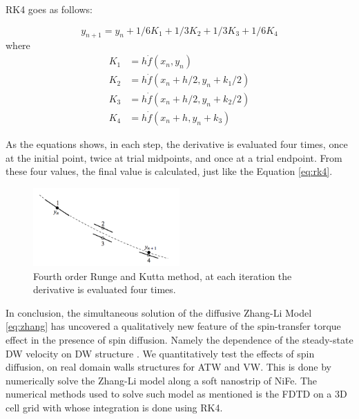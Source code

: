 RK4 goes as follows:

\begin{equation} \label{eq:rk4}
y_{n+1} = y_{n} + 1/6 K_{1} + 1/3 K_{2} +1/3 K_{3} + 1/6 K_{4}
\end{equation}
where
\begin{equation}
\begin{split} \label{eq:rksplit}
K_{1} &= h \dot f(x_{n}, y_{n}) \\
K_{2} &= h \dot f(x_{n} + h/2, y_{n} + k_{1}/2) \\
K_{3} &= h \dot f(x_{n} + h/2, y_{n} + k_{2}/2) \\
K_{4} &= h \dot f(x_{n} + h, y_{n} + k_{3})
\end{split}
\end{equation}

As the equations shows, in each step, the derivative is evaluated four times, once at the initial point, twice at trial midpoints, and once at a trial endpoint. From these four values, the final value is calculated, just like the Equation \ref{eq:rk4}.

\begin{figure}[htbp]
	\centering
		\includegraphics[width=0.5\textwidth]{Figures/rk4.png}
		\smallskip
	\caption[Fourth order Runge and Kutta Method]{Fourth order Runge and Kutta method, at each iteration the derivative is evaluated four times.}
	\label{fig:kutta}
\end{figure}


\vspace{4.0em}

In conclusion, the simultaneous solution of the diffusive Zhang-Li Model \ref{eq:zhang} has uncovered a qualitatively new feature of the spin-transfer torque effect in the presence of spin diffusion. Namely the dependence of the steady-state DW velocity on DW structure \cite{claudio}. We quantitatively test the effects of spin diffusion, on real domain walls structures for ATW and VW. This is done by numerically solve the Zhang-Li model along a soft nanostrip of NiFe. The numerical methods used to solve such model as mentioned is the FDTD on a 3D cell grid with whose integration is done using RK4.






